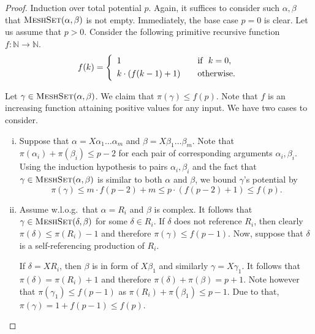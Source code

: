 \documentclass[11pt,a4paper]{amsart}
\theoremstyle{definition}
\newcommand{\MeshSet}[2]{\textsc{MeshSet}(#1,#2)}
\newcommand{\potential}[1]{\pi(#1)}
\begin{document}
\begin{proof}
        Induction over total potential $p$. Again, it suffices to consider such $\alpha, \beta$ that $\MeshSet{\alpha}{\beta}$ is not empty. Immediately, the base case $p = 0$ is clear. Let us assume that $p > 0$. Consider the following primitive recursive function $f :\mathbb{N} \to \mathbb{N}$.
\begin{equation*}
  f(k) = \left\{\begin{array}{r@{}l@{\qquad}l}
    & 1 & \text{if }\ k = 0, \\[\jot]
    & k \cdot \left( f(k-1) + 1 \right) & \text{otherwise.}
  \end{array}\right.
\end{equation*} 
    
	Let $\gamma \in \MeshSet{\alpha}{\beta}$. We claim that $\potential{\gamma}
    \leq f(p)$. Note that
    $f$ is an increasing function attaining positive values for any input. 
    We have two cases to consider.
    \begin{enumerate}[(i)]
        \item Suppose that $\alpha = X \alpha_1 \ldots \alpha_m$
                and $\beta = X \beta_1 \ldots \beta_m$. Note that
                $\potential{\alpha_i} + \potential{\beta_i} \leq p - 2$ 
                for each pair of corresponding arguments $\alpha_i, \beta_i$. Using
                 the induction hypothesis to pairs $\alpha_i, \beta_i$ and 
                 the fact that $\gamma \in \MeshSet{\alpha}{\beta}$ is 
                 similar to both $\alpha$ and $\beta$, we bound $\gamma$'s potential by
                \[\potential{\gamma} \leq m \cdot f(p-2) + m \leq p \cdot (f(p-2) + 1) \leq f(p). \]
        \item Assume w.l.o.g.~that $\alpha = R_i$ and $\beta$ is complex.
                It follows that $\gamma \in \MeshSet{\delta}{\beta}$ for some
                $\delta \in R_i$. If $\delta$ does not reference $R_i$, then
                clearly $\potential{\delta} \leq \potential{R_i} - 1$ and
                therefore $\potential{\gamma} \leq f(p-1)$. Now, suppose that
                $\delta$ is a self-referencing production of $R_i$. 
                
                If $\delta = X R_i$, then $\beta$ is in form of $X \beta_1$ and
                similarly $\gamma = X \gamma_1$. It follows that $\potential{\delta}
                 = \potential{R_i} + 1$ and therefore $\potential{\delta} +
                  \potential{\beta} = p + 1$. Note however that $\potential{\gamma_1}
                 \leq f(p-1)$ as $\potential{R_i} + \potential{\beta_1} \leq p - 1$.
                 Due to that, $\potential{\gamma} = 1 + f(p - 1) \leq f(p)$.
                 

\end{enumerate}
\end{proof}
\end{document}
